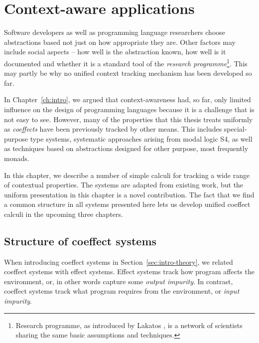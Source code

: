 
\chapter{Context-aware applications} 
\label{ch:applications} 

Software developers as well as programming language researchers choose abstractions based not 
just on how appropriate they are. Other factors may include social aspects -- how well is the 
abstraction known, how well is it documented and whether it is a standard tool of the 
\emph{research programme}\footnote{ Research programme, as introduced by Lakatos \cite{philosophy-lakatos},
is a network of scientists sharing the same basic assumptions and techniques.}. This may
partly be why no unified context tracking mechanism has been developed so far.

In Chapter~\ref{ch:intro}, we argued that context-awareness had, so far, only limited influence 
on the design of programming languages because it is a challenge that is not easy to
see. However, many of the properties that this thesis treats uniformly as \emph{coeffects} have been
previously tracked by other means. This includes special-purpose type systems, systematic 
approaches arising from modal logic S4, as well as techniques based on abstractions designed 
for other purpose, most frequently monads.

In this chapter, we describe a number of simple calculi for tracking a wide range of contextual
properties. The systems are adapted from existing work, but the uniform presentation in this 
chapter is a novel contribution. The fact that we find a common structure in all systems presented 
here lets us develop unified coeffect calculi in the upcoming three chapters.


\section{Structure of coeffect systems}

When introducing coeffect systems in Section~\ref{sec:intro-theory}, we related coeffect systems
with effect systems. Effect systems track how program affects the environment, or, in other words 
capture some \emph{output impurity}. In contrast, coeffect systems track what program requires from the 
environment, or \emph{input impurity}.

